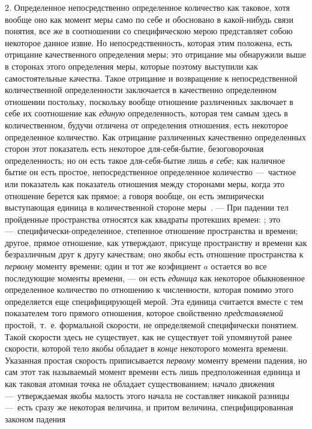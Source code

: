 2. Определенное непосредственно определенное количество как таковое, хотя
вообще оно как момент меры само по себе и обосновано в какой-нибудь связи
понятия, все же в соотношении со специфическою мерою представляет собою
некоторое данное извне. Но непосредственность, которая этим положена, есть
отрицание качественного определения меры; это отрицание мы обнаружили выше
в сторонах этого определения меры, которые поэтому выступили как
самостоятельные качества. Такое отрицание и возвращение к непосредственной
количественной определенности заключается в качественно определенном
отношении постольку, поскольку вообще отношение различенных заключает в
себе их соотношение как {\em единую} определенность,
которая тем самым здесь в количественном, будучи отличена от определения
отношения, есть некоторое определенное количество. Как отрицание
различенных качественно определенных сторон этот показатель есть некоторое
для-себя-бытие, безоговорочная определенность; но он есть такое
для-себя-бытие лишь {\em в себе}; как наличное бытие он
есть простое, непосредственное определенное количество —~частное или
показатель как показатель отношения между сторонами меры, когда это
отношение берется как прямое; а говоря вообще, он есть эмпирически
выступающая единица в количественной стороне
меры~\label{bkm:Ref474666655}.
— При падении тел пройденные пространства относятся как квадраты протекших
времен: ; это —~специфически-определенное, степенное отношение пространства
и времени; другое, прямое отношение, как утверждают, присуще пространству и
времени как безразличным друг к другу качествам; оно якобы есть отношение
пространства к {\em первому} моменту времени; один и
тот же коэфициент $a$ остается во все последующие
моменты времени, — он есть {\em единица} как некоторое
обыкновенное определенное количество по отношению к численности, которая
помимо этого определяется еще специфицирующей мерой. Эта единица считается
вместе с тем показателем того прямого отношения, которое свойственно
{\em представляемой} простой,~т.~е. формальной
скорости, не определяемой специфически понятием. Такой скорости здесь не
существует, как не существует той упомянутой ранее скорости, которой тело
якобы обладает в {\em конце} некоторого момента
времени. Указанная простая скорость приписывается
{\em первому} моменту времени падения, но сам этот так
называемый момент времени есть лишь предположенная единица и как таковая
атомная точка не обладает существованием; начало движения —~утверждаемая
якобы малость этого начала не составляет никакой разницы —~есть сразу же
некоторая величина, и притом величина, специфицированная законом падения
